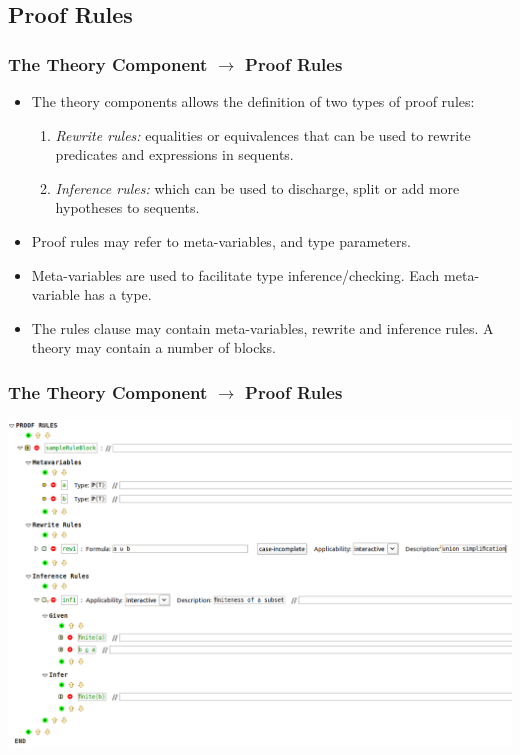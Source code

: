 \documentclass{beamer}
\begin{document}
\subsection{Proof Rules}
	\begin{frame}
		\frametitle{The Theory Component $\rightarrow$ Proof Rules}
		\begin{itemize}
			\item The theory components allows the definition of two types of proof rules:
				\begin{enumerate}
					\item \emph{Rewrite rules:}  equalities or equivalences that can be used to rewrite predicates and expressions in sequents.
					\item \emph{Inference rules:} which can be used to discharge, split or add more hypotheses to sequents.
				\end{enumerate}
			\item Proof rules may refer to meta-variables, and type parameters.
			\item Meta-variables are used to facilitate type inference/checking. Each meta-variable has a type.
			\item The rules clause may contain meta-variables, rewrite and inference rules. A theory may contain a number of  blocks.
		\end{itemize}
	\end{frame}
	\begin{frame}
		\frametitle{The Theory Component $\rightarrow$ Proof Rules}
		\begin{center}
			\includegraphics[scale=0.3]{RulesBlock}
		\end{center}
	\end{frame}
\end{document}
